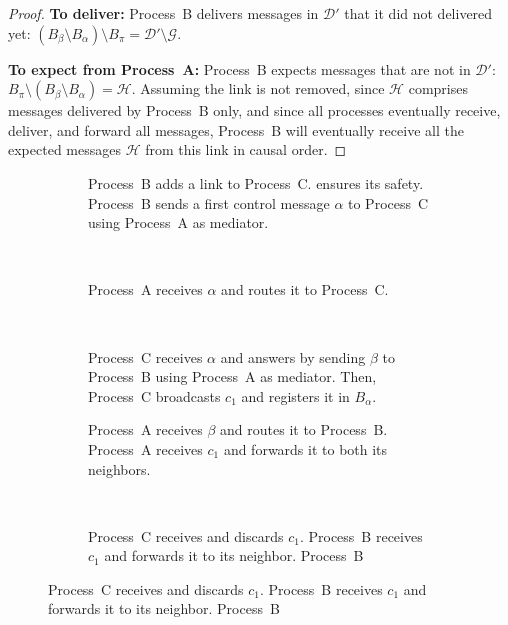 \begin{proof}
  \noindent \textbf{To deliver:} Process~B delivers messages in $\mathcal{D}'$
  that it did not delivered yet:
  $(B_\beta\setminus B_\alpha) \setminus B_\pi = \mathcal{D}' \setminus
  \mathcal{G}$.
  
  \noindent \textbf{To expect from Process~A:} Process~B expects messages that
  are not in $\mathcal{D}'$:
  $B_\pi \setminus (B_\beta \setminus B_\alpha) = \mathcal{H}$.  Assuming the
  link is not removed, since $\mathcal{H}$ comprises messages delivered by
  Process~B only, and since all processes eventually receive, deliver, and
  forward all messages, Process~B will eventually receive all the expected
  messages $\mathcal{H}$ from this link in causal order.
\end{proof}


\begin{figure}
  \begin{center}
    \begin{subfigure}[t]{0.31\textwidth}
      \centering%
      \caption{\label{fig:solveA}Process~B adds a link to
        Process~C. \RPCBROADCAST ensures its safety. Process~B sends a first
        control message $\alpha$ to Process~C using Process~A as mediator.}
    \end{subfigure}
    ~
    \begin{subfigure}[t]{0.31\textwidth}
      \centering%
      \caption{\label{fig:solveB}Process~A receives $\alpha$ and routes it to
        Process~C.}
    \end{subfigure}
    ~
    \begin{subfigure}[t]{0.31\textwidth}
      \centering%
      \caption{\label{fig:solveC}Process~C receives $\alpha$ and answers by
        sending $\beta$ to Process~B using Process~A as mediator. Then,
        Process~C broadcasts $c_1$ and registers it in $B_\alpha$.}
    \end{subfigure}
    \begin{subfigure}[t]{0.48\textwidth}
      \centering%
      \caption{\label{fig:solveD}Process~A receives $\beta$ and routes it to
        Process~B.  Process~A receives $c_1$ and forwards it to both its
        neighbors.}
    \end{subfigure}
    ~
    \begin{subfigure}[t]{0.48\textwidth}
      \centering%
      \caption{\label{fig:solveE}Process~C receives and discards $c_1$.
        Process~B receives $c_1$ and forwards it to its neighbor.  Process~B
}
\end{subfigure}
\end{center}
\end{figure}

